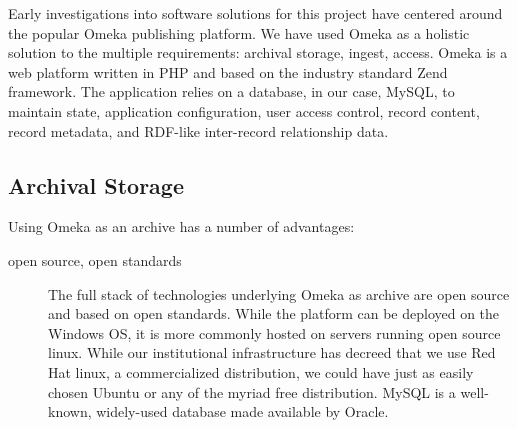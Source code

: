 Early investigations into software solutions for this project have centered around the popular Omeka publishing platform. We have used Omeka as a holistic solution to the multiple requirements: archival storage, ingest, access. Omeka is a web platform written in PHP and based on the industry standard Zend framework. The application relies on a database, in our case, MySQL, to maintain state, application configuration, user access control, record content, record metadata, and RDF-like inter-record relationship data.
\subsection{Archival Storage}
Using Omeka as an archive has a number of advantages:
\begin{description}
  \item[open source, open standards]{The full stack of technologies underlying Omeka as archive are open source and based on open standards. While the platform can be deployed on the Windows OS, it is more commonly hosted on servers running open source linux. While our institutional infrastructure has decreed that we use Red Hat linux, a commercialized distribution, we could have just as easily chosen Ubuntu or any of the myriad free distribution. MySQL is a well-known, widely-used database made available by Oracle. }
\end{description}